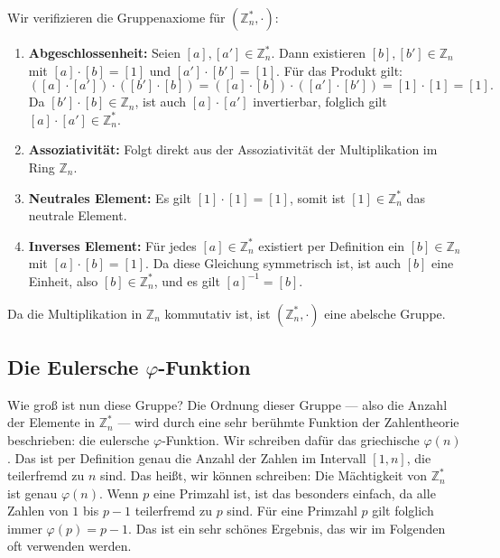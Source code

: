 \begin{math-stroke}

\begin{short-proof}
Wir verifizieren die Gruppenaxiome für $(\mathbb{Z}_n^*, \cdot)$:
\begin{enumerate}[label=\textbf{(\arabic*)}]
    \item \textbf{Abgeschlossenheit:} Seien $[a], [a'] \in \mathbb{Z}_n^*$. Dann existieren $[b], [b'] \in \mathbb{Z}_n$ mit $[a] \cdot [b] = [1]$ und $[a'] \cdot [b'] = [1]$. Für das Produkt gilt:
    \[
    ([a] \cdot [a']) \cdot ([b'] \cdot [b]) = ([a] \cdot [b]) \cdot ([a'] \cdot [b']) = [1] \cdot [1] = [1].
    \]
    Da $[b'] \cdot [b] \in \mathbb{Z}_n$, ist auch $[a] \cdot [a']$ invertierbar, folglich gilt $[a] \cdot [a'] \in \mathbb{Z}_n^*$.
    \item \textbf{Assoziativität:} Folgt direkt aus der Assoziativität der Multiplikation im Ring $\mathbb{Z}_n$.
    \item \textbf{Neutrales Element:} Es gilt $[1] \cdot [1] = [1]$, somit ist $[1] \in \mathbb{Z}_n^*$ das neutrale Element.
    \item \textbf{Inverses Element:} Für jedes $[a] \in \mathbb{Z}_n^*$ existiert per Definition ein $[b] \in \mathbb{Z}_n$ mit $[a] \cdot [b] = [1]$. Da diese Gleichung symmetrisch ist, ist auch $[b]$ eine Einheit, also $[b] \in \mathbb{Z}_n^*$, und es gilt $[a]^{-1} = [b]$.
\end{enumerate}
Da die Multiplikation in $\mathbb{Z}_n$ kommutativ ist, ist $(\mathbb{Z}_n^*, \cdot)$ eine abelsche Gruppe.
\end{short-proof}
\end{math-stroke}

\subsection{Die Eulersche \texorpdfstring{$\varphi$}{phi}-Funktion}

\begin{spoken-clean}[00:36:01 - 00:38:56]
Wie groß ist nun diese Gruppe? Die Ordnung dieser Gruppe --- also die Anzahl der Elemente in $\mathbb{Z}_n^*$ --- wird durch eine sehr berühmte Funktion der Zahlentheorie beschrieben: die eulersche $\varphi$-Funktion. Wir schreiben dafür das griechische $\varphi(n)$. Das ist per Definition genau die Anzahl der Zahlen im Intervall $[1, n]$, die teilerfremd zu $n$ sind. Das heißt, wir können schreiben: Die Mächtigkeit von $\mathbb{Z}_n^*$ ist genau $\varphi(n)$. Wenn $p$ eine Primzahl ist, ist das besonders einfach, da alle Zahlen von $1$ bis $p-1$ teilerfremd zu $p$ sind. Für eine Primzahl $p$ gilt folglich immer $\varphi(p) = p - 1$. Das ist ein sehr schönes Ergebnis, das wir im Folgenden oft verwenden werden.
\end{spoken-clean}

